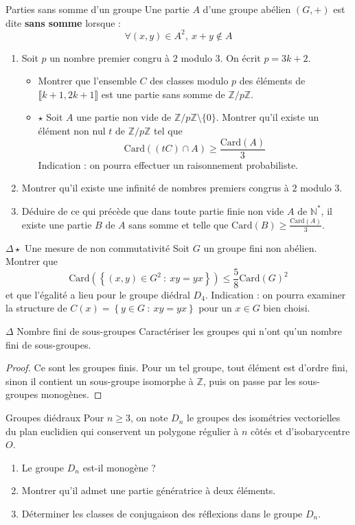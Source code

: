 \documentclass[french,a4paper]{article}
\newcommand{\N}{\mathbb{N}}
\newcommand{\Z}{\mathbb{Z}}
\newcommand{\st}{^*}
\newcommand{\card}{\text{Card}}
\theoremstyle{plain}
\theoremstyle{definition}
\theoremstyle{remark}
\begin{document}
\begin{ex}[Moulin.13]{Parties sans somme d'un groupe}
	Une partie $A$ d'une groupe abélien $(G,+)$ est dite \textbf{sans somme} lorsque : $$\forall (x,y)\in A^2,\ x+y\notin A$$
	\begin{enumerate}
		\item Soit $p$ un nombre premier congru à $2$ modulo $3$. On écrit $p=3k+2$.
		\begin{itemize}
			\item Montrer que l'ensemble $C$ des classes modulo $p$ des éléments de $\llbracket k+1,2k+1\rrbracket$ est une partie sans somme de $\Z/p\Z$.
			\item $\star$ Soit $A$ une partie non vide de $\Z/p\Z\setminus\{0\}$. Montrer qu'il existe un élément non nul $t$ de $\Z/p\Z$ tel que $$\card((tC)\cap A)\geqslant\frac{\card(A)}{3}$$ Indication : on pourra effectuer un raisonnement probabiliste.
		\end{itemize}
		\item Montrer qu'il existe une infinité de nombres premiers congrus à $2$ modulo $3$.
		\item Déduire de ce qui précède que dans toute partie finie non vide $A$ de $\N\st$, il existe une partie $B$ de $A$ sans somme et telle que $\displaystyle\card(B)\geqslant\frac{\card(A)}{3}$.
	\end{enumerate}
\end{ex}

\begin{ex}[Moulin.14]{$\Delta\star$ Une mesure de non commutativité}
	Soit $G$ un groupe fini non abélien. Montrer que $$\card\left(\left\{(x,y)\in G^2\ : \ xy=yx\right\}\right)\leqslant\frac{5}{8}\card(G)^2$$ et que l'égalité a lieu pour le groupe diédral $D_4$. Indication : on pourra examiner la structure de $C(x)=\left\{y\in G\ : \ xy=yx\right\}$ pour un $x\in G$ bien choisi.
\end{ex}

\begin{ex}[Moulin.15 / X]{$\Delta$ Nombre fini de sous-groupes}
	Caractériser les groupes qui n'ont qu'un nombre fini de sous-groupes.
\end{ex}

\begin{proof}
	Ce sont les groupes finis. Pour un tel groupe, tout élément est d'ordre fini, sinon il contient un sous-groupe isomorphe à $\Z$, puis on passe par les sous-groupes monogènes.
\end{proof}

\begin{ex}[Moulin.16]{Groupes diédraux}
	Pour $n\geqslant 3$, on note $D_n$ le groupes des isométries vectorielles du plan euclidien qui conservent un polygone régulier à $n$ côtés et d'isobarycentre $O$.
	\begin{enumerate}
		\item Le groupe $D_n$ est-il monogène ?
		\item Montrer qu'il admet une partie génératrice à deux éléments.
		\item Déterminer les classes de conjugaison des réflexions dans le groupe $D_n$.
	\end{enumerate}
\end{ex}
\end{document}

